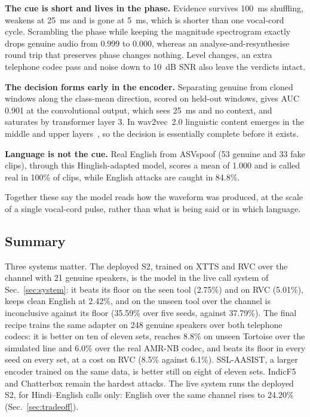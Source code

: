 \textbf{The cue is short and lives in the phase.} Evidence survives 100~ms
shuffling, weakens at 25~ms and is gone at 5~ms, which is shorter than one
vocal-cord cycle. Scrambling the phase while keeping the magnitude spectrogram
exactly drops genuine audio from 0.999 to 0.000, whereas an analyse-and-resynthesise
round trip that preserves phase changes nothing. Level changes, an extra telephone
codec pass and noise down to 10~dB SNR also leave the verdicts intact.

\textbf{The decision forms early in the encoder.} Separating genuine from cloned
windows along the class-mean direction, scored on held-out windows, gives AUC 0.901
at the convolutional output, which sees 25~ms and no context, and saturates by
transformer layer 3. In wav2vec~2.0 linguistic content emerges in the middle and
upper layers~\cite{pasad2021layerwise}, so the decision is essentially complete
before it exists.

\textbf{Language is not the cue.} Real English from ASVspoof (53 genuine and 33 fake
clips), through this Hinglish-adapted model, scores a mean of 1.000 and is called real in 100\% of
clips, while English attacks are caught in 84.8\%.

Together these say the model reads how the waveform was produced, at the scale of a
single vocal-cord pulse, rather than what is being said or in which language.

\subsection{Summary}
Three systems matter. The deployed S2, trained on XTTS and RVC over the channel with 21
genuine speakers, is the model in the live call system of Sec.~\ref{sec:system}: it beats
its floor on the seen tool (2.75\%) and on RVC (5.01\%), keeps clean English at 2.42\%, and
on the unseen tool over the channel is inconclusive against its floor (35.59\% over five
seeds, against 37.79\%). The final recipe trains the same adapter on 248 genuine speakers
over both telephone codecs: it is better on ten of eleven sets, reaches 8.8\% on unseen
Tortoise over the simulated line and 6.0\% over the real AMR-NB codec, and beats its floor
in every seed on every set, at a cost on RVC (8.5\% against 6.1\%). SSL-AASIST, a larger
encoder trained on the same data, is better still on eight of eleven sets. IndicF5 and
Chatterbox remain the hardest attacks. The live system runs the deployed S2, for
Hindi--English calls only: English over the same channel rises to 24.20\%
(Sec.~\ref{sec:tradeoff}).
